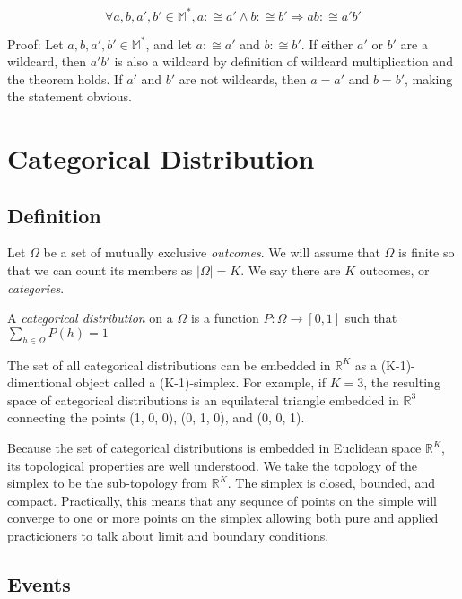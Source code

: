 \documentclass[twoside]{article}
\begin{document}
\begin{equation}
\label{eq:matching_multiplication}
\forall a,b,a',b' \in \mathbb{M^*}, a :\cong a' \wedge b :\cong b' \Rightarrow ab :\cong a'b'
\end{equation}

Proof: Let \(a,b,a',b' \in \mathbb{M^*}\), and let \(a :\cong a'\) and \(b :\cong b'\). If either \(a'\) or \(b'\) are a wildcard, then \(a'b'\) is also a wildcard by definition of wildcard multiplication and the theorem holds. If \(a'\) and \(b'\) are not wildcards, then \(a = a'\) and \(b = b'\), making the statement obvious.

\section{Categorical Distribution}

\subsection{Definition}

Let \(\Omega\) be a set of mutually exclusive \textit{outcomes}. We will assume that \(\Omega\) is finite so that we can count its members as \(|\Omega| = K\). We say there are \(K\) outcomes, or \textit{categories}.

A \textit{categorical distribution} on a \(\Omega\) is a function \(P: \Omega \rightarrow [0, 1]\) such that \(\sum_{h \in \Omega} P(h) = 1\)

The set of all categorical distributions can be embedded in \(\mathbb{R}^K\) as a (K-1)-dimentional object called a (K-1)-simplex. For example, if \(K = 3\), the resulting space of categorical distributions is an equilateral triangle embedded in \(\mathbb{R}^3\) connecting the points (1, 0, 0), (0, 1, 0), and (0, 0, 1).

Because the set of categorical distributions is embedded in Euclidean space \(\mathbb{R}^K\), its topological properties are well understood. We take the topology of the simplex to be the sub-topology from \(\mathbb{R}^K\). The simplex is closed, bounded, and compact. Practically, this means that any sequnce of points on the simple will converge to one or more points on the simplex allowing both pure and applied practicioners to talk about limit and boundary conditions.

\subsection{Events}
\end{document}
